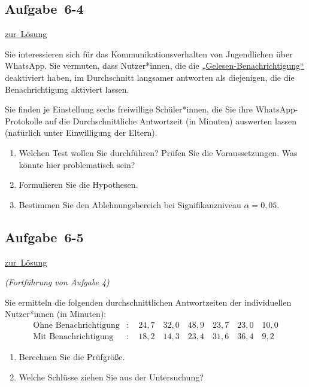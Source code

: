 \documentclass[
  11pt,
  ngerman,
  a4paper,
]{report}
\providecommand{\tightlist}{%
  \setlength{\itemsep}{0pt}\setlength{\parskip}{0pt}}
\begin{document}
\hypertarget{aufgabe-6-4}{%
\subsection{Aufgabe~6-4}\label{aufgabe-6-4}}

\protect\hyperlink{loesung-6-4}{zur~Lösung}

Sie interessieren sich für das Kommunikationsverhalten von Jugendlichen über WhatsApp. Sie vermuten, dass Nutzer*innen, die die \href{https://faq.whatsapp.com/en/android/28000015/?lang=de}{„Gelesen-Benachrichtigung``} deaktiviert haben, im Durchschnitt langsamer antworten als diejenigen, die die Benachrichtigung aktiviert lassen.

Sie finden je Einstellung sechs freiwillige Schüler*innen, die Sie ihre WhatsApp-Protokolle auf die Durchschnittliche Antwortzeit (in Minuten) auswerten lassen (natürlich unter Einwilligung der Eltern).

\begin{enumerate}
\def\labelenumi{\alph{enumi})}
\tightlist
\item
  Welchen Test wollen Sie durchführen? Prüfen Sie die Voraussetzungen. Was könnte hier problematisch sein?
\item
  Formulieren Sie die Hypothesen.
\item
  Bestimmen Sie den Ablehnungsbereich bei Signifikanzniveau \(\alpha=0{,}05\).
\end{enumerate}

\hypertarget{aufgabe-6-5}{%
\subsection{Aufgabe~6-5}\label{aufgabe-6-5}}

\protect\hyperlink{loesung-6-5}{zur~Lösung}

\emph{(Fortführung von Aufgabe 4)}

Sie ermitteln die folgenden durchschnittlichen Antwortzeiten der individuellen Nutzer*innen (in Minuten):
\[\begin{aligned}
\textrm{Ohne Benachrichtigung} &: \quad 24{,}7\quad32{,}0\quad48{,}9\quad23{,}7\quad23{,}0\quad10{,}0\\
\textrm{Mit Benachrichtigung} &: \quad18{,}2\quad14{,}3\quad23{,}4\quad31{,}6\quad36{,}4\quad 9{,}2
\end{aligned}\]

\begin{enumerate}
\def\labelenumi{\alph{enumi})}
\tightlist
\item
  Berechnen Sie die Prüfgröße.
\item
  Welche Schlüsse ziehen Sie aus der Untersuchung?
\end{enumerate}
\end{document}

